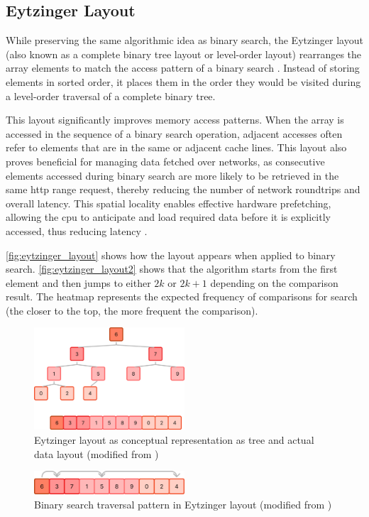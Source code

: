 \subsection{Eytzinger Layout}
\label{tb:eytzinger_layout}

While preserving the same algorithmic idea as binary search, the Eytzinger layout (also known as a complete binary tree layout or level-order layout) rearranges the array elements to match the access pattern of a binary search \citep{binary_search}. Instead of storing elements in sorted order, it places them in the order they would be visited during a level-order traversal of a complete binary tree.

This layout significantly improves memory access patterns. When the array is accessed in the sequence of a binary search operation, adjacent accesses often refer to elements that are in the same or adjacent cache lines. This layout also proves beneficial for managing data fetched over networks, as consecutive elements accessed during binary search are more likely to be retrieved in the same \ac{http} range request, thereby reducing the number of network roundtrips and overall latency. This spatial locality enables effective hardware prefetching, allowing the \ac{cpu} to anticipate and load required data before it is explicitly accessed, thus reducing latency \citep{binary_search}.

\autoref{fig:eytzinger_layout} shows how the layout appears when applied to binary search. \autoref{fig:eytzinger_layout2} shows that the algorithm starts from the first element and then jumps to either $2k$ or $2k+1$ depending on the comparison result. The heatmap represents the expected frequency of comparisons for search (the closer to the top, the more frequent the comparison).

\begin{figure}[ht]
  \centering
  \includegraphics[width=0.5\textwidth]{figs/related_work_theoretical_bg/eytzinger_layout.png}
  \caption{Eytzinger layout as conceptual representation as tree and actual data layout (modified from \citet{binary_search})}
  \label{fig:eytzinger_layout}
\end{figure}
\begin{figure}[ht]
  \centering
  \includegraphics[width=0.5\textwidth]{figs/related_work_theoretical_bg/eytzinger_layout2.png}
  \caption{Binary search traversal pattern in Eytzinger layout (modified from \citet{binary_search})}
  \label{fig:eytzinger_layout2}
\end{figure}

